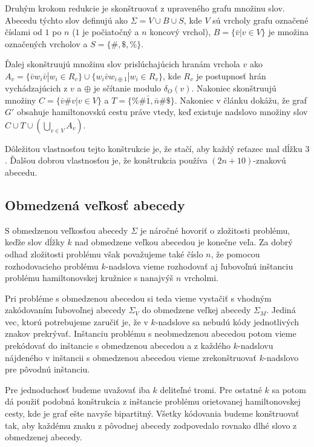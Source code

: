 Druhým krokom redukcie je skonštruovať z upraveného grafu množinu slov. Abecedu
týchto slov definujú ako $\Sigma = V \cup B \cup S$, kde $V$ sú vrcholy grafu označené
číslami od $1$ po $n$ ($1$ je počiatočný a $n$ koncový vrchol), $B = \{ \bar{v} | v \in V \}$
je množina označených vrcholov a $S = \{\#, \$, \% \}$.

Ďalej skonštruujú množinu slov prislúchajúcich hranám vrchola $v$ ako
$A_v = \{ \bar{v}w_i\bar{v} | w_i \in R_v\} \cup \{ w_i \bar{v} w_{i \oplus 1} | w_i \in R_v\}$,
kde $R_v$ je postupnosť hrán vychádzajúcich z $v$ a $\oplus$ je sčítanie modulo $\delta_O(v)$.
Nakoniec skonštruujú množiny $C = \{ \bar{v} \# v | v \in V\}$ a $T = \{ \% \# \bar{1}, \bar{n} \# \$\}$.
Nakoniec v článku dokážu, že graf $G'$ obsahuje hamiltonovskú cestu práve vtedy, keď
existuje nadslovo množiny slov $C \cup T \cup (\bigcup\limits_{v \in V} A_v)$.

Dôležitou vlastnosťou tejto konštrukcie je, že stačí, aby každý reťazec mal dĺžku $3$. Ďalšou dobrou
vlastnosťou je, že konštrukcia používa $(2n + 10)$-znakovú abecedu.

\subsection{Obmedzená veľkosť abecedy}

S obmedzenou veľkosťou abecedy $\Sigma$ je náročné hovoriť o zložitosti problému, keďže
slov dĺžky $k$ nad obmedzene veľkou abecedou je konečne veľa. Za dobrý odhad
zložitosti problému však považujeme také číslo $n$, že pomocou rozhodovacieho
problému $k$-nadslova vieme rozhodovať aj ľubovoľnú inštanciu problému
hamiltonovskej kružnice s nanajvýš $n$ vrcholmi.

Pri probléme s obmedzenou abecedou si teda vieme vystačiť s vhodným zakódovaním
ľubovoľnej abecedy $\Sigma_V$ do obmedzene veľkej abecedy $\Sigma_M$. Jediná vec, ktorú potrebujeme zaručiť
je, že v $k$-nadslove sa nebudú kódy jednotlivých znakov prekrývať. Inštanciu
problému s neobmedzenou abecedou potom vieme prekódovať do inštancie s obmedzenou
abecedou a z každého $k$-nadslovu nájdeného v inštancii s obmedzenou abecedou
vieme zrekonštruovať $k$-nadslovo pre pôvodnú inštanciu.

Pre jednoduchosť budeme uvažovať iba $k$ deliteľné tromi. Pre ostatné $k$ sa
potom dá použiť podobná konštrukcia z inštancie problému orietovanej hamiltonovskej cesty,
kde je graf ešte navyše bipartitný. Všetky kódovania budeme konštruovať tak, aby
každému znaku z pôvodnej abecedy zodpovedalo rovnako dlhé slovo z obmedzenej abecedy.


